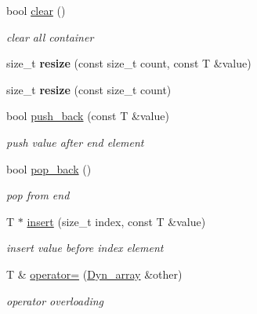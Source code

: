\begin{DoxyCompactItemize}
\mbox{\label{classDyn__array_aa7dee5a6c9f658532f9175b45d3f24e5}} 
bool \hyperlink{classDyn__array_aa7dee5a6c9f658532f9175b45d3f24e5}{clear} ()
\begin{DoxyCompactList}\small\item\em clear all container \end{DoxyCompactList}\item 
\mbox{\label{classDyn__array_a2412c58d9a14876406e4f0ca10722020}} 
size\+\_\+t {\bfseries resize} (const size\+\_\+t count, const T \&value)
\item 
\mbox{\label{classDyn__array_a3eefab6e61af85f898727d5a44ecf0ec}} 
size\+\_\+t {\bfseries resize} (const size\+\_\+t count)
\item 
bool \hyperlink{classDyn__array_a24797d477a7655bf37d1b1dd97eac1e3}{push\+\_\+back} (const T \&value)
\begin{DoxyCompactList}\small\item\em push value after end element \end{DoxyCompactList}\item 
\mbox{\label{classDyn__array_ac28c19e9c075fe6a72cf9fcaeed70d90}} 
bool \hyperlink{classDyn__array_ac28c19e9c075fe6a72cf9fcaeed70d90}{pop\+\_\+back} ()
\begin{DoxyCompactList}\small\item\em pop from end \end{DoxyCompactList}\item 
T $\ast$ \hyperlink{classDyn__array_a4b261db6ebc4b4b13136e262c955c71a}{insert} (size\+\_\+t index, const T \&value)
\begin{DoxyCompactList}\small\item\em insert value before index element \end{DoxyCompactList}\item 
\mbox{\label{classDyn__array_a3038b3c6558794e168a7a5d7f58a3701}} 
T \& \hyperlink{classDyn__array_a3038b3c6558794e168a7a5d7f58a3701}{operator=} (\hyperlink{classDyn__array}{Dyn\+\_\+array} \&other)
\begin{DoxyCompactList}\small\item\em operator overloading \end{DoxyCompactList}\item 

\end{DoxyCompactItemize}
